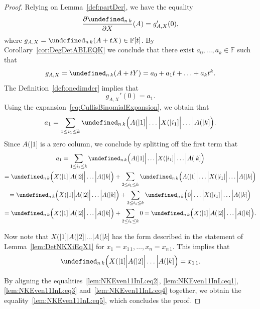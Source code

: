 \documentclass{elsarticle}
\let\det\undefined
\DeclareMathOperator{\det}{det}
\def\F{{\mathbb F}}
\theoremstyle{definition}
\numberwithin{equation}{section}
\begin{document}
\begin{proof}
Relying on Lemma~\ref{def:partDer}, we have the equality 
\begin{equation}\label{lem:NKEven11InL:eq2}
\frac{\partial \det_{n\,k}}{\partial X}(A) = g_{A, X}'(0),
\end{equation}
where $g_{A, X} = \det_{n\,k}(A + tX) \in \F[t]$. By Corollary~\ref{cor:DegDetABLEQK} we conclude that there exist $a_0, \ldots, a_k \in \F$ such that
 \[ g_{A, X} = \det_{n\, k} (A + t Y) = a_0 + a_1t + \ldots + a_k t^k.
  \]
The Definition~\ref{def:onedimder} implies that 
\begin{equation}\label{lem:NKEven11InL:eq1}
g_{A, X}'(0) = a_1.
\end{equation}
Using the expansion~\eqref{eq:CullisBinomialExpansion}, we obtain that 
\[
a_1 = \sum_{1 \le i_1 \le k} \det_{n\,k}\Bigl(A(|1]\Big|\ldots \Big| X(|i_1] \Big| \ldots \Big| A(|k] \Bigr).\]
Since $A(|1]$ is a zero column, we conclude by splitting off the first term that
\begin{multline}\label{lem:NKEven11InL:eq3}
a_1 = \sum_{1 \le i_1 \le k} \det_{n\,k}\Bigl(A(|1]\Big|\ldots \Big| X(|i_1] \Big| \ldots \Big| A(|k] \Bigr)\\
 = \det_{n\,k} \Bigl(X(|1] \Big| A(|2] \Big| \ldots \Big| A(|k]\Bigr)  + \sum_{2 \le i_1 \le k} \det_{n\,k}\Bigl(A(|1]\Big|\ldots \Big| X(|i_1] \Big| \ldots \Big| A(|k] \Bigr)\\
 = \det_{n\,k} \Bigl(X(|1] \Big| A(|2] \Big| \ldots \Big| A(|k]\Bigr)  + \sum_{2 \le i_1 \le k} \det_{n\,k}\Bigl(0\Big|\ldots \Big| X(|i_1] \Big| \ldots \Big| A(|k] \Bigr)\\
 =  \det_{n\,k} \Bigl(X(|1] \Big| A(|2] \Big| \ldots \Big| A(|k]\Bigr) + \sum_{2 \le i_1 \le k} 0
 = \det_{n\,k} \Bigl(X(|1] \Big| A(|2] \Big| \ldots \Big| A(|k]\Bigr).
\end{multline}

Now note that $X(|1] \Big| A(|2] \Big| \ldots \Big| A(|k]$ has the form described in the statement of Lemma~\ref{lem:DetNKXiEqX1} for $x_1 = x_{1\,1}, \ldots, x_n = x_{n\,1}$. This implies that\begin{equation}\label{lem:NKEven11InL:eq4}
\det_{n\,k} \Bigl(X(|1] \Big| A(|2] \Big| \ldots \Big| A(|k]\Bigr) = x_{1\,1}.
\end{equation}

By aligning the equalities~\eqref{lem:NKEven11InL:eq2}, \eqref{lem:NKEven11InL:eq1}, \eqref{lem:NKEven11InL:eq3} and~\eqref{lem:NKEven11InL:eq4}  together, we obtain the equality~\eqref{lem:NKEven11InL:eq5}, which concludes the proof.
\end{proof}
\end{document}

